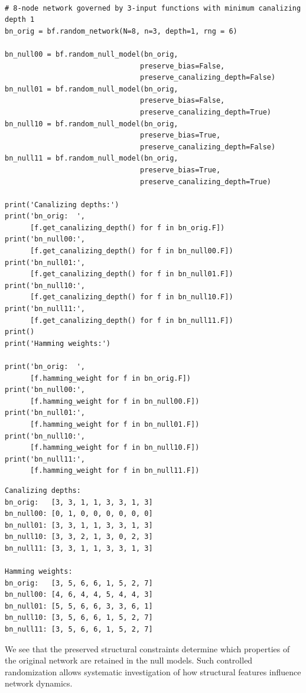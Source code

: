 \documentclass[
]{article}
\begin{document}
\begin{lstlisting}

# 8-node network governed by 3-input functions with minimum canalizing depth 1
bn_orig = bf.random_network(N=8, n=3, depth=1, rng = 6)

bn_null00 = bf.random_null_model(bn_orig, 
                                preserve_bias=False, 
                                preserve_canalizing_depth=False)
bn_null01 = bf.random_null_model(bn_orig, 
                                preserve_bias=False, 
                                preserve_canalizing_depth=True)
bn_null10 = bf.random_null_model(bn_orig, 
                                preserve_bias=True, 
                                preserve_canalizing_depth=False)
bn_null11 = bf.random_null_model(bn_orig, 
                                preserve_bias=True, 
                                preserve_canalizing_depth=True)

print('Canalizing depths:')
print('bn_orig:  ',
      [f.get_canalizing_depth() for f in bn_orig.F])
print('bn_null00:',
      [f.get_canalizing_depth() for f in bn_null00.F])
print('bn_null01:',
      [f.get_canalizing_depth() for f in bn_null01.F])
print('bn_null10:',
      [f.get_canalizing_depth() for f in bn_null10.F])
print('bn_null11:',
      [f.get_canalizing_depth() for f in bn_null11.F])
print()
print('Hamming weights:')

print('bn_orig:  ',
      [f.hamming_weight for f in bn_orig.F])
print('bn_null00:',
      [f.hamming_weight for f in bn_null00.F])
print('bn_null01:',
      [f.hamming_weight for f in bn_null01.F])
print('bn_null10:',
      [f.hamming_weight for f in bn_null10.F])
print('bn_null11:',
      [f.hamming_weight for f in bn_null11.F])
\end{lstlisting}

\begin{lstlisting}
Canalizing depths:
bn_orig:   [3, 3, 1, 1, 3, 3, 1, 3]
bn_null00: [0, 1, 0, 0, 0, 0, 0, 0]
bn_null01: [3, 3, 1, 1, 3, 3, 1, 3]
bn_null10: [3, 3, 2, 1, 3, 0, 2, 3]
bn_null11: [3, 3, 1, 1, 3, 3, 1, 3]

Hamming weights:
bn_orig:   [3, 5, 6, 6, 1, 5, 2, 7]
bn_null00: [4, 6, 4, 4, 5, 4, 4, 3]
bn_null01: [5, 5, 6, 6, 3, 3, 6, 1]
bn_null10: [3, 5, 6, 6, 1, 5, 2, 7]
bn_null11: [3, 5, 6, 6, 1, 5, 2, 7]
\end{lstlisting}

We see that the preserved structural constraints determine which
properties of the original network are retained in the null models. Such
controlled randomization allows systematic investigation of how
structural features influence network dynamics.
\end{document}

